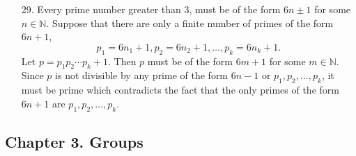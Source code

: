 {\begin{itemize}
 
\item[29.]
Every prime number greater than 3, must be of the form $6 n \pm 1$ for some $n \in \mathbb N$.
Suppose that there are only a finite number of primes of  the form $6n +1$,
\[
p_1 = 6n_1 + 1, p_2 = 6 n_2 + 1, \ldots, p_k = 6n_k + 1.
\]
Let $p = p_1 p_2 \cdots p_k + 1$.  Then $p$ must be of the form $6m + 1$ for some $m \in \mathbb N$.  Since $p$ is not divisible by any prime of the form $6 n -1$ or $p_1, p_2, \ldots, p_k$, it must be prime which contradicts the fact that the only primes of the form $6n + 1$ are $p_1, p_2, \ldots, p_k$.

 
\end{itemize}
}
 
 
 
\subsection*{Chapter 3. Groups}
 

